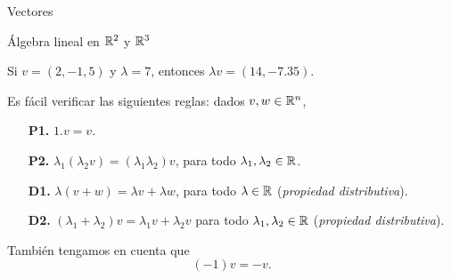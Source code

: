 \begin{chapter}{Vectores}
\begin{section}{\'Algebra lineal en $\mathbb R^2$ y $\mathbb R^3$}
    \begin{ejemplo*}
         Si $v= (2, -1,5)$  y $\lambda = 7$, entonces $\lambda v = (14, -7.35)$.
    \end{ejemplo*}
    
    Es fácil verificar las siguientes reglas: dados $v,w \in \mathbb R^n$, 
    \begin{enumerate}
        \item[\textbf{P1.}] $1.v=v$.
        \item[\textbf{P2.}] $\lambda_1(\lambda_2v) = (\lambda_1\lambda_2)v$, para todo $\lambda_1,\lambda_2 \in \mathbb R$.
        \item[\textbf{D1.}] $\lambda(v+w) = \lambda v +\lambda w$, para todo $\lambda \in \mathbb R$  (\textit{propiedad distributiva}).
        \item[\textbf{D2.}] $(\lambda_1+\lambda_2)v = \lambda_1v + \lambda_2 v$ para todo $\lambda_1,\lambda_2 \in \mathbb R$  (\textit{propiedad distributiva}).
    \end{enumerate}

    También tengamos en cuenta que 
    \begin{equation*}
        (-1)v = -v.
    \end{equation*}
    

\end{section}
\end{chapter}
